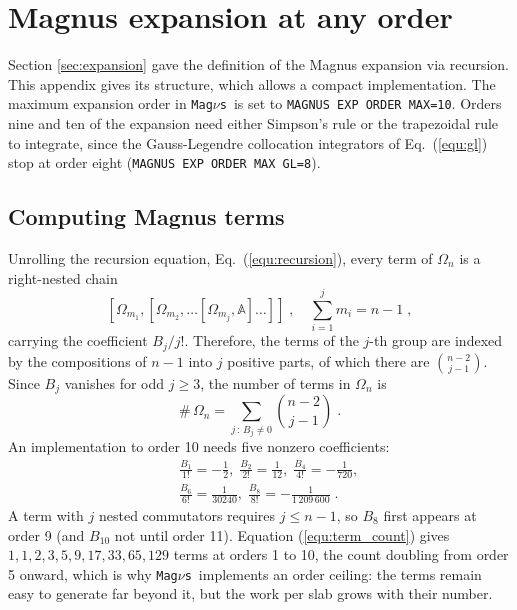 \documentclass[final,5p,times,twocolumn,sort,compress]{elsarticle}
\makeatletter
\newcommand{\eq}{Eq.}
\DeclareRobustCommand{\_}{%
  \ifmmode\nfss@text{\textunderscore}\else\textunderscore\allowbreak\fi}
\newcommand{\equ}[1]{\eq~(\ref{equ:#1})}
\newcommand{\magnus}{{\tt Mag}\ensuremath{\nu}{\tt s}}
\makeatother
\begin{document}




\appendix

\renewcommand{\thefigure}{\Alph{section}.\arabic{figure}}
\renewcommand{\thetable}{\Alph{section}.\arabic{table}}
\newcommand{\appresetfloats}{\setcounter{figure}{0}\setcounter{table}{0}}


\section{Magnus expansion at any order}
\label{app:terms}
\appresetfloats

Section \ref{sec:expansion} gave the definition of the Magnus expansion via recursion. This appendix gives its structure, which allows a compact implementation. The maximum expansion order in \magnus\ is set to {\tt MAGNUS\_EXP\_ORDER\_MAX=10}. Orders nine and ten of the expansion need either Simpson's rule or the trapezoidal rule to integrate, since the Gauss-Legendre collocation integrators of \equ{gl} stop at order eight ({\tt MAGNUS\_EXP\_ORDER\_MAX\_GL=8}).

\subsection{Computing Magnus terms}

Unrolling the recursion equation, \equ{recursion}, every term of $\Omega_n$ is a right-nested chain
\begin{equation}
 \label{equ:nested}
 \left[\Omega_{m_1}, \left[\Omega_{m_2}, \ldots
 \left[\Omega_{m_j}, \mathbb{A}\right] \ldots \right]\right] \;,
 \quad
 \sum_{i=1}^{j} m_i = n-1 \;,
\end{equation}
carrying the coefficient $B_j/j!$. Therefore, the terms of the $j$-th group are indexed by the compositions of $n-1$ into $j$ positive parts, of which there are $\binom{n-2}{j-1}$. Since $B_j$ vanishes for odd $j \geq 3$, the number of terms in $\Omega_n$ is
\begin{equation}
 \label{equ:term_count}
 \#\,\Omega_n = \sum_{j\,:\,B_j \neq 0} \binom{n-2}{j-1} \;.
\end{equation}
An implementation to order 10 needs five nonzero coefficients:
\begin{eqnarray}
 \label{equ:bernoulli}
 && \frac{B_1}{1!} = -\frac{1}{2} , \;
 \frac{B_2}{2!} = \frac{1}{12} , \;
 \frac{B_4}{4!} = -\frac{1}{720} , \; \nonumber \\
 && \frac{B_6}{6!} = \frac{1}{30240} , \;
 \frac{B_8}{8!} = -\frac{1}{1\,209\,600} \;.
\end{eqnarray}
A term with $j$ nested commutators requires $j \leq n-1$, so $B_8$ first appears at order 9 (and $B_{10}$ not until order 11). Equation (\ref{equ:term_count}) gives $1, 1, 2, 3, 5, 9, 17, 33, 65, 129$ terms at orders 1 to 10, the count doubling from order 5 onward, which is why \magnus\ implements an order ceiling: the terms remain easy to generate far beyond it, but the work per slab grows with their number.
\end{document}
